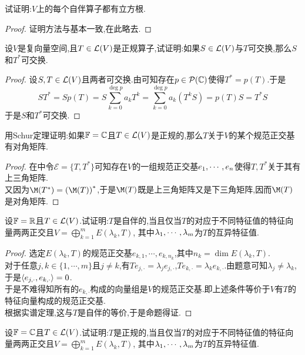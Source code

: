 \documentclass{ctexart}
\begin{document}
\begin{problem}[11.]
    试证明:$V$上的每个自伴算子都有立方根.
\end{problem}
\begin{proof}
    证明方法与基本一致,在此略去.
\end{proof}
\begin{problem}[12.]
    设$V$是复向量空间,且$T\in\mathcal{L}(V)$是正规算子,试证明:如果$S\in\mathcal{L}(V)$与$T$可交换,那么$S$和$T^*$可交换.
\end{problem}
\begin{proof}
    设$S,T\in\mathcal{L}(V)$且两者可交换.由可知存在$p\in\mathcal{P}(\mathbb{C})$使得$T^*=p(T)$.于是
    \[ST^*=Sp(T)=S\sum_{k=0}^{\deg p}a_{k}T^k=\sum_{k=0}^{\deg p}a_k(T^kS)=p(T)S=T^*S\]
    于是$S$和$T^*$可交换.
\end{proof}
\begin{problem}[13.]
    用Schur定理证明:如果$\mathbb{F}=\mathbb{C}$且$T\in\mathcal{L}(V)$是正规的,那么$T$关于$V$的某个规范正交基有对角矩阵.
\end{problem}
\begin{proof}
    在中令$\mathcal{E}=\{T,T^*\}$可知存在$V$的一组规范正交基${e}_1,\cdots,{e}_{n}$使得$T,T^*$关于其有上三角矩阵.\\
    又因为$\M(T^*)=\left(\M(T)\right)^*$,于是$\M(T)$既是上三角矩阵又是下三角矩阵,因而$\M(T)$是对角矩阵.
\end{proof}
\begin{problem}[14.]
    设$\mathbb{F}=\mathbb{R}$且$T\in\mathcal{L}(V)$.试证明:$T$是自伴的,当且仅当$T$的对应于不同特征值的特征向量两两正交且$\displaystyle V=\bigoplus_{k=1}^{m}E(\lambda_k,T)$,%
    其中${\lambda}_1,\cdots,{\lambda}_{m}$为$T$的互异特征值.
\end{problem}
\begin{proof}
    选定$E(\lambda_k,T)$的规范正交基$e_{k,1},\cdots,e_{k,n_k}$,其中$n_k=\dim E(\lambda_k,T)$.\\
    对于任意$j,k\in\{1,\cdots,m\}$且$j\neq k$,有$Te_{j,\cdot}=\lambda_{j}e_{j,\cdot}$,$Te_{k,\cdot}=\lambda_ke_{k,\cdot}$.由题意可知$\lambda_j\neq\lambda_k$,于是$\left\langle{e_{j,\cdot}},{e_{k,\cdot}}\right\rangle=0$.\\
    于是不难得知所有的$e_{k,\cdot}$构成的向量组是$V$的规范正交基.即上述条件等价于$V$有$T$的特征向量构成的规范正交基.\\
    根据实谱定理,这与$T$是自伴的等价,于是命题得证.
\end{proof}
\begin{problem}[15.]
    设$\mathbb{F}=\mathbb{C}$且$T\in\mathcal{L}(V)$.试证明:$T$是正规的,当且仅当$T$的对应于不同特征值的特征向量两两正交且$\displaystyle V=\bigoplus_{k=1}^{m}E(\lambda_k,T)$,%
    其中${\lambda}_1,\cdots,{\lambda}_{m}$为$T$的互异特征值.
\end{problem}
\end{document}
